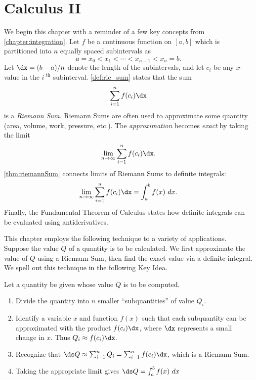 \part{Calculus II}


We begin this chapter with a reminder of a few key concepts from \autoref{chapter:integration}. Let $f$ be a continuous function on $[a,b]$ which is partitioned into $n$ equally spaced subintervals as 
\[a=x_0 < x_1 < \cdots < x_{n-1}<x_n=b.\]
Let $\dx=(b-a)/n$ denote the length of the  subintervals, and let $c_i$ be any $x$-value in the $i^\text{ th}$ subinterval. \autoref{def:rie_sum} states that the sum
\[\sum_{i=1}^n f(c_i)\dx\]
is a \textit{Riemann Sum.} Riemann Sums are often used to approximate some quantity (area, volume, work, pressure, etc.). The \textit{approximation} becomes \textit{exact} by taking the limit 
\[\lim_{n\to\infty} \sum_{i=1}^n f(c_i)\dx.\]
\autoref{thm:riemannSum} connects limits of Riemann Sums to definite integrals:
\[\lim_{n\to\infty} \sum_{i=1}^n f(c_i)\dx = \int_a^b f(x)\ dx.\]
Finally, the Fundamental Theorem of Calculus states how definite integrals can be evaluated using antiderivatives. 

This chapter employs the following technique to a variety of applications. Suppose the value $Q$ of a quantity is to be calculated. We first approximate the value of $Q$ using a Riemann Sum, then find the exact value via a definite integral. We spell out this technique in the following Key Idea.

{Let a quantity be given whose value $Q$ is to be computed.
\begin{enumerate}
\item	Divide the quantity into $n$ smaller ``subquantities'' of value $Q_i$.
\item	Identify a variable $x$ and function $f(x)$ such that each subquantity can be approximated with the product $f(c_i)\dx$, where $\dx$ represents a small change in $x$. Thus $Q_i \approx f(c_i)\dx$.
\item	Recognize that $\ds Q\approx \sum_{i=1}^n Q_i = \sum_{i=1}^n f(c_i)\dx$, which is a Riemann Sum.
\item	Taking the appropriate limit gives $\ds Q = \int_a^b f(x)\ dx$
\end{enumerate}}

